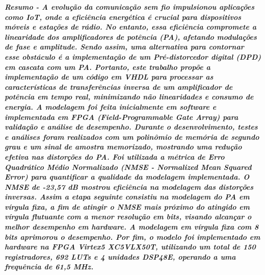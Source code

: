 \documentclass[twocolumn, a4paper]{article}
\begin{document}
\begin{strip}
  \vspace*{\dimexpr-\baselineskip-\stripsep\relax}
   \maketitle
  \vskip\baselineskip
\noindent %
  \vskip\baselineskip
\end{strip}
\thispagestyle{specialfooter}
\vspace{3pt}\textbf{\textit{Resumo - A evolução da comunicação sem fio impulsionou aplicações como IoT, onde a eficiência energética é crucial para dispositivos móveis e estações de rádio. No entanto, essa eficiência compromete a linearidade dos amplificadores de potência (PA), afetando modulações de fase e amplitude. Sendo assim, uma alternativa para contornar esse obstáculo é a implementação de um Pré-distorcedor digital (DPD) em cascata com um PA. Portanto, este trabalho propõe a implementação de um código em VHDL para processar as características de transferências inversa de um amplificador de potência em tempo real, minimizando não linearidades e consumo de energia. A modelagem foi feita inicialmente em software e implementada em FPGA (Field-Programmable Gate Array) para validação e análise de desempenho. Durante o desenvolvimento, testes e análises foram realizados com um polinômio de memória de segundo grau e um sinal de amostra memorizado, mostrando uma redução efetiva nas distorções do PA. Foi utilizada a métrica de Erro Quadrático Médio Normalizado (NMSE - Normalized Mean Squared Error) para quantificar a qualidade da modelagem implementada. O NMSE de -23,57 dB mostrou eficiência na modelagem das distorções inversas. Assim a etapa seguinte consistiu na modelagem do PA em vírgula fixa, a fim de atingir o NMSE mais próximo do atingido em vírgula flutuante com a menor resolução em bits, visando alcançar o melhor desempenho em hardware. A modelagem em vírgula fixa com 8 bits aprimorou o desempenho. Por fim, o modelo foi implementado em hardware na FPGA Virtex5 XC5VLX50T, utilizando um total de 150 registradores, 692 LUTs e 4 unidades DSP48E, operando a uma frequência de 61,5 MHz.}}
\end{document}
